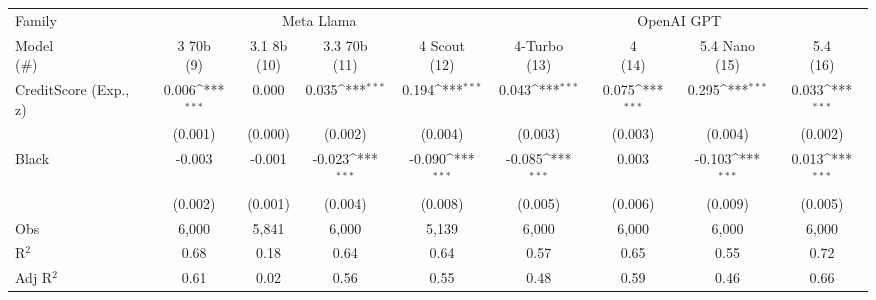 {
\def\sym#1{\ifmmode^{#1}\else\(^{#1}\)\fi}
\begin{tabular}{l*{8}{c}}
\toprule
Family          &\multicolumn{4}{c}{Meta Llama}                                             &\multicolumn{4}{c}{OpenAI GPT}                                             \\\cmidrule(lr){2-5}\cmidrule(lr){6-9}
\shortstack{\vphantom{Model Opus}Model\\(\#)}&\shortstack{\vphantom{Model Opus}3 70b   \\(9)}         &\shortstack{\vphantom{Model Opus}3.1 8b  \\(10)}         &\shortstack{\vphantom{Model Opus}3.3 70b \\(11)}         &\shortstack{\vphantom{Model Opus}4 Scout \\(12)}         &\shortstack{\vphantom{Model Opus}4-Turbo \\(13)}         &\shortstack{\vphantom{Model Opus}4       \\(14)}         &\shortstack{\vphantom{Model Opus}5.4 Nano\\(15)}         &\shortstack{\vphantom{Model Opus}5.4     \\(16)}         \\
\midrule
CreditScore (Exp., z)&    0.006\sym{***}&    0.000         &    0.035\sym{***}&    0.194\sym{***}&    0.043\sym{***}&    0.075\sym{***}&    0.295\sym{***}&    0.033\sym{***}\\
                &  (0.001)         &  (0.000)         &  (0.002)         &  (0.004)         &  (0.003)         &  (0.003)         &  (0.004)         &  (0.002)         \\
Black           &   -0.003         &   -0.001         &   -0.023\sym{***}&   -0.090\sym{***}&   -0.085\sym{***}&    0.003         &   -0.103\sym{***}&    0.013\sym{***}\\
                &  (0.002)         &  (0.001)         &  (0.004)         &  (0.008)         &  (0.005)         &  (0.006)         &  (0.009)         &  (0.005)         \\
\midrule
Obs             &    6,000         &    5,841         &    6,000         &    5,139         &    6,000         &    6,000         &    6,000         &    6,000         \\
R$^2$           &     0.68         &     0.18         &     0.64         &     0.64         &     0.57         &     0.65         &     0.55         &     0.72         \\
Adj R$^2$       &     0.61         &     0.02         &     0.56         &     0.55         &     0.48         &     0.59         &     0.46         &     0.66         \\

\end{tabular}}
